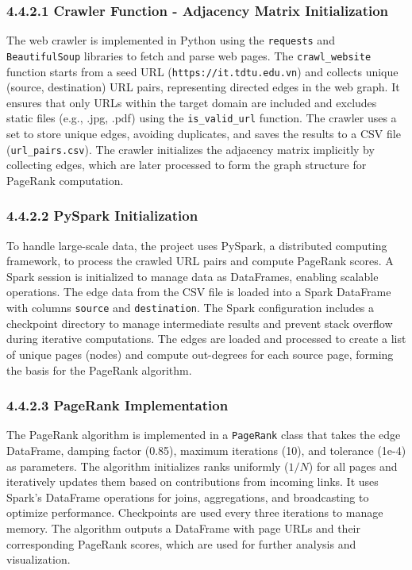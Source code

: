 \documentclass{article}
\begin{document}
\subsubsection*{4.4.2.1 Crawler Function - Adjacency Matrix Initialization}

The web crawler is implemented in Python using the \texttt{requests} and \texttt{BeautifulSoup} libraries to fetch and parse web pages. The \texttt{crawl\_website} function starts from a seed URL (\texttt{https://it.tdtu.edu.vn}) and collects unique (source, destination) URL pairs, representing directed edges in the web graph. It ensures that only URLs within the target domain are included and excludes static files (e.g., .jpg, .pdf) using the \texttt{is\_valid\_url} function. The crawler uses a set to store unique edges, avoiding duplicates, and saves the results to a CSV file (\texttt{url\_pairs.csv}). The crawler initializes the adjacency matrix implicitly by collecting edges, which are later processed to form the graph structure for PageRank computation.

\subsubsection*{4.4.2.2 PySpark Initialization}

To handle large-scale data, the project uses PySpark, a distributed computing framework, to process the crawled URL pairs and compute PageRank scores. A Spark session is initialized to manage data as DataFrames, enabling scalable operations. The edge data from the CSV file is loaded into a Spark DataFrame with columns \texttt{source} and \texttt{destination}. The Spark configuration includes a checkpoint directory to manage intermediate results and prevent stack overflow during iterative computations. The edges are loaded and processed to create a list of unique pages (nodes) and compute out-degrees for each source page, forming the basis for the PageRank algorithm.

\subsubsection*{4.4.2.3 PageRank Implementation}

The PageRank algorithm is implemented in a \texttt{PageRank} class that takes the edge DataFrame, damping factor (0.85), maximum iterations (10), and tolerance (1e-4) as parameters. The algorithm initializes ranks uniformly (\( 1/N \)) for all pages and iteratively updates them based on contributions from incoming links. It uses Spark's DataFrame operations for joins, aggregations, and broadcasting to optimize performance. Checkpoints are used every three iterations to manage memory. The algorithm outputs a DataFrame with page URLs and their corresponding PageRank scores, which are used for further analysis and visualization.
\end{document}
